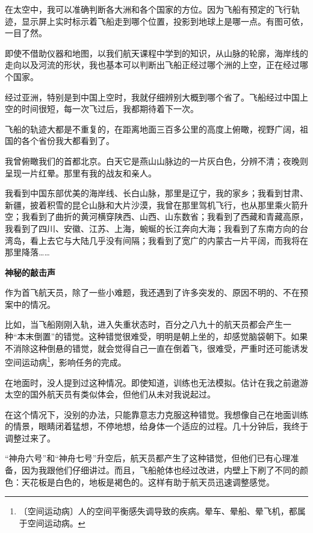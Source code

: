\documentclass[12pt,UTF-8,openany]{ctexbook}
\begin{document}
\begin{normalsize}
    在太空中，我可以准确判断各大洲和各个国家的方位。因为飞船有预定的飞行轨迹，显示屏上实时标示着飞船走到哪个位置，投影到地球上是哪一点。有图可依，一目了然。
    
    即使不借助仪器和地图，以我们航天课程中学到的知识，从山脉的轮廓，海岸线的走向以及河流的形状，我也基本可以判断出飞船正经过哪个洲的上空，正在经过哪个国家。
    
    经过亚洲，特别是到中国上空时，我就仔细辨别大概到哪个省了。飞船经过中国上空的时间很短，每一次飞过后，我都期待着下一次。
    
    飞船的轨迹大都是不重复的，在距离地面三百多公里的高度上俯瞰，视野广阔，祖国的各个省份我大都看到了。
    
    我曾俯瞰我们的首都北京。白天它是燕山山脉边的一片灰白色，分辨不清；夜晚则呈现一片红晕。那里有我的战友和亲人。
    
    我看到中国东部优美的海岸线、长白山脉，那里是辽宁，我的家乡；我看到甘肃、新疆，披着积雪的昆仑山脉和大片沙漠，我曾在那里驾机飞行，也从那里乘火箭升空；我看到了曲折的黄河横穿陕西、山西、山东数省；我看到了西藏和青藏高原，我看到了四川、安徽、江苏、上海，蜿蜒的长江奔向大海；我看到了东南方向的台湾岛，看上去它与大陆几乎没有间隔；我看到了宽广的内蒙古一片平阔，而我将在那里降落……
    
    \begin{large}\textbf{神秘的敲击声}\end{large}
    
    作为首飞航天员，除了一些小难题，我还遇到了许多突发的、原因不明的、不在预案中的情况。
    
    比如，当飞船刚刚入轨，进入失重状态时，百分之八九十的航天员都会产生一种“本末倒置”的错觉。这种错觉很难受，明明是朝上坐的，却感觉脑袋朝下。如果不消除这种倒悬的错觉，就会觉得自己一直在倒着飞，很难受，严重时还可能诱发空间运动病\footnote{〔空间运动病〕人的空间平衡感失调导致的疾病。晕车、晕船、晕飞机，都属于空间运动病。}，影响任务的完成。
    
    在地面时，没人提到过这种情况。即使知道，训练也无法模拟。估计在我之前遨游太空的国外航天员有类似体会，但他们从未对我说起过。
    
    在这个情况下，没别的办法，只能靠意志力克服这种错觉。我想像自己在地面训练的情景，眼睛闭着猛想，不停地想，给身体一个适应的过程。几十分钟后，我终于调整过来了。
    
    “神舟六号”和“神舟七号”升空后，航天员都产生了这种错觉，但他们已有心理准备，因为我跟他们仔细讲过。而且，飞船舱体也经过改进，内壁上下刷了不同的颜色：天花板是白色的，地板是褐色的。这样有助于航天员迅速调整感觉。
    

\end{normalsize}
\end{document}
